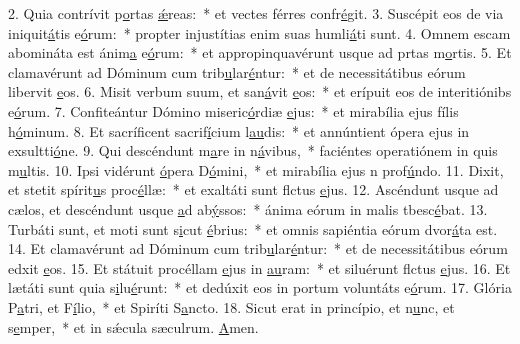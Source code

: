 2. Quia contrívit p\uline{o}rtas \uline{ǽ}reas:~* et vectes férres confr\uline{é}git.
3. Suscépit eos de via iniquit\uline{á}tis e\uline{ó}rum:~* propter injustítias enim suas humli\uline{á}ti sunt.
4. Omnem escam abomináta est ánim\uline{a} e\uline{ó}rum:~* et appropinquavérunt usque ad prtas m\uline{o}rtis.
5. Et clamavérunt ad Dóminum cum trib\uline{u}lar\uline{é}ntur:~* et de necessitátibus eórum libervit \uline{e}os.
6. Misit verbum suum, et san\uline{á}vit \uline{e}os:~* et erípuit eos de interitiónibs e\uline{ó}rum.
7. Confiteántur Dómino miseric\uline{ó}rdiæ \uline{e}jus:~* et mirabília ejus fílis h\uline{ó}minum.
8. Et sacríficent sacrif\uline{í}cium l\uline{au}dis:~* et annúntient ópera ejus in exsultti\uline{ó}ne.
9. Qui descéndunt m\uline{a}re in n\uline{á}vibus,~* faciéntes operatiónem in quis m\uline{u}ltis.
10. Ipsi vidérunt \uline{ó}pera D\uline{ó}mini,~* et mirabília ejus n prof\uline{ú}ndo.
11. Dixit, et stetit spírit\uline{u}s proc\uline{é}llæ:~* et exaltáti sunt flctus \uline{e}jus.
12. Ascéndunt usque ad cælos, et descéndunt usque \uline{a}d ab\uline{ý}ssos:~* ánima eórum in malis tbesc\uline{é}bat.
13. Turbáti sunt, et moti sunt s\uline{i}cut \uline{é}brius:~* et omnis sapiéntia eórum dvor\uline{á}ta est.
14. Et clamavérunt ad Dóminum cum trib\uline{u}lar\uline{é}ntur:~* et de necessitátibus eórum edxit \uline{e}os.
15. Et státuit procéllam \uline{e}jus in \uline{au}ram:~* et siluérunt flctus \uline{e}jus.
16. Et lætáti sunt quia s\uline{i}lu\uline{é}runt:~* et dedúxit eos in portum voluntáts e\uline{ó}rum.
17. Glória P\uline{a}tri, et F\uline{í}lio,~* et Spiríti S\uline{a}ncto.
18. Sicut erat in princípio, et n\uline{u}nc, et s\uline{e}mper,~* et in sǽcula sæculrum. \uline{A}men.
